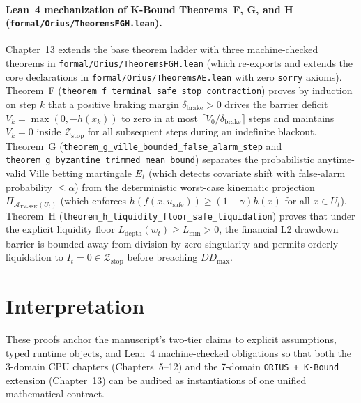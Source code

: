\paragraph{Lean~4 mechanization of K-Bound Theorems~F, G, and H (\texttt{formal/\allowbreak Orius/\allowbreak TheoremsFGH.lean}).}
Chapter~13 extends the base theorem ladder with three machine-checked theorems in
\texttt{formal/\allowbreak Orius/\allowbreak TheoremsFGH.lean} (which re-exports and extends the core declarations
in \texttt{formal/\allowbreak Orius/\allowbreak TheoremsAE.lean} with zero \texttt{sorry} axioms). Theorem~F
(\texttt{theorem\_\allowbreak f\_\allowbreak terminal\_\allowbreak safe\_\allowbreak stop\_\allowbreak contraction}) proves by induction on step $k$ that
a positive braking margin $\delta_{\text{brake}}>0$ drives the barrier deficit $V_k=\max(0,-h(x_k))$
to zero in at most $\lceil V_0/\delta_{\text{brake}}\rceil$ steps and maintains $V_k=0$ inside
$\mathcal{Z}_{\text{stop}}$ for all subsequent steps during an indefinite blackout. Theorem~G
(\texttt{theorem\_\allowbreak g\_\allowbreak ville\_\allowbreak bounded\_\allowbreak false\_\allowbreak alarm\_\allowbreak step} and \texttt{theorem\_\allowbreak g\_\allowbreak byzantine\_\allowbreak trimmed\_\allowbreak mean\_\allowbreak bound})
separates the probabilistic anytime-valid Ville betting martingale $E_t$ (which detects covariate shift
with false-alarm probability $\le\alpha$) from the deterministic worst-case kinematic projection
$\Pi_{\mathcal{A}_{\text{TV-SSK}}(U_t)}$ (which enforces $h(f(x,u_{\text{safe}}))\ge (1-\gamma)h(x)$
for all $x\in U_t$). Theorem~H (\texttt{theorem\_\allowbreak h\_\allowbreak liquidity\_\allowbreak floor\_\allowbreak safe\_\allowbreak liquidation}) proves
that under the explicit liquidity floor $L_{\text{depth}}(w_t)\ge L_{\min}>0$, the financial L2
drawdown barrier is bounded away from division-by-zero singularity and permits orderly liquidation
to $I_t=0\in\mathcal{Z}_{\text{stop}}$ before breaching $DD_{\max}$.

\section{Interpretation}
These proofs anchor the manuscript's two-tier claims to explicit assumptions, typed runtime
objects, and Lean~4 machine-checked obligations so that both the 3-domain CPU chapters
(Chapters~5--12) and the 7-domain \texttt{ORIUS + K-Bound} extension (Chapter~13) can be
audited as instantiations of one unified mathematical contract.

